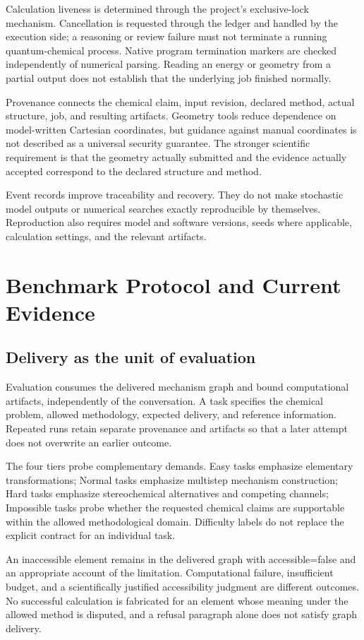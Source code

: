 \documentclass[11pt,a4paper]{article}
\begin{document}
Calculation liveness is determined through the project's exclusive-lock mechanism. Cancellation is requested through the ledger and handled by the execution side; a reasoning or review failure must not terminate a running quantum-chemical process. Native program termination markers are checked independently of numerical parsing. Reading an energy or geometry from a partial output does not establish that the underlying job finished normally.

Provenance connects the chemical claim, input revision, declared method, actual structure, job, and resulting artifacts. Geometry tools reduce dependence on model-written Cartesian coordinates, but guidance against manual coordinates is not described as a universal security guarantee. The stronger scientific requirement is that the geometry actually submitted and the evidence actually accepted correspond to the declared structure and method.

Event records improve traceability and recovery. They do not make stochastic model outputs or numerical searches exactly reproducible by themselves. Reproduction also requires model and software versions, seeds where applicable, calculation settings, and the relevant artifacts.

\section{Benchmark Protocol and Current Evidence}

\subsection{Delivery as the unit of evaluation}
Evaluation consumes the delivered mechanism graph and bound computational artifacts, independently of the conversation. A task specifies the chemical problem, allowed methodology, expected delivery, and reference information. Repeated runs retain separate provenance and artifacts so that a later attempt does not overwrite an earlier outcome.

The four tiers probe complementary demands. Easy tasks emphasize elementary transformations; Normal tasks emphasize multistep mechanism construction; Hard tasks emphasize stereochemical alternatives and competing channels; Impossible tasks probe whether the requested chemical claims are supportable within the allowed methodological domain. Difficulty labels do not replace the explicit contract for an individual task.

An inaccessible element remains in the delivered graph with accessible=false and an appropriate account of the limitation. Computational failure, insufficient budget, and a scientifically justified accessibility judgment are different outcomes. No successful calculation is fabricated for an element whose meaning under the allowed method is disputed, and a refusal paragraph alone does not satisfy graph delivery.
\end{document}

